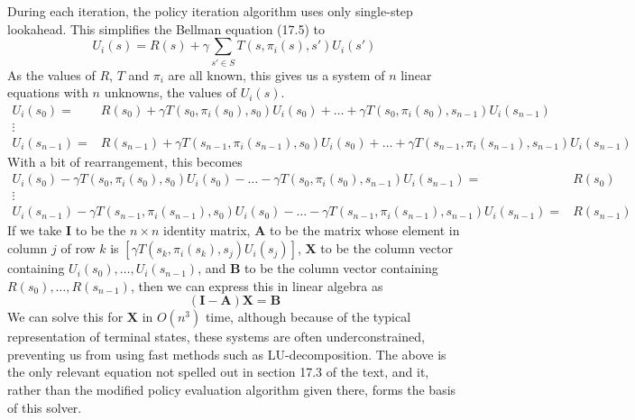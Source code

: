 \documentclass[paper=letter,pagesize=automedia,twoside=false,12pt]{scrartcl}
\theoremstyle{plain}%
\theoremstyle{definition}
\theoremstyle{remark}
\begin{document}
During each iteration, the policy iteration algorithm uses only single-step lookahead.  This simplifies the Bellman equation (17.5) to
\[ U_i(s) = R(s) + \gamma \sum_{s' \in S} T\left(s,\pi_i(s),s'\right) U_i\left(s'\right)
\]
As the values of \(R\), \(T\) and \(\pi_i\) are all known, this gives us a system of \(n\) linear equations with \(n\) unknowns, the values of \(U_i(s)\).
\begin{eqnarray*}
U_i(s_0) =&
R(s_0) + \gamma T\left(s_0,\pi_i(s_0),s_0\right) U_i\left(s_0\right) +
\ldots + \gamma T\left(s_0,\pi_i(s_0),s_{n-1}\right) U_i\left(s_{n-1}\right)
 \\
\vdots& \\
U_i(s_{n-1}) =&
R(s_{n-1}) + \gamma T\left(s_{n-1},\pi_i(s_{n-1}),s_0\right) U_i\left(s_0\right) +
\ldots + \gamma T\left(s_{n-1},\pi_i(s_{n-1}),s_{n-1}\right) U_i\left(s_{n-1}\right)
\end{eqnarray*}
With a bit of rearrangement, this becomes
\begin{eqnarray*}
U_i(s_0) - \gamma T\left(s_0,\pi_i(s_0),s_0\right) U_i\left(s_0\right) -
\ldots - \gamma T\left(s_0,\pi_i(s_0),s_{n-1}\right) U_i\left(s_{n-1}\right)
=& R(s_0)
 \\
\vdots& \\
U_i(s_{n-1}) - \gamma T\left(s_{n-1},\pi_i(s_{n-1}),s_0\right) U_i\left(s_0\right) -
\ldots - \gamma T\left(s_{n-1},\pi_i(s_{n-1}),s_{n-1}\right) U_i\left(s_{n-1}\right)
=& R(s_{n-1})
\end{eqnarray*}
If we take \(\mathbf{I}\) to be the \(n \times n\) identity matrix, \(\mathbf{A}\) to be the matrix whose element in column \(j\) of row \(k\) is \( \left[ \gamma T\left(s_k,\pi_i(s_k),s_j\right) U_i\left(s_j\right) \right] \), \(\mathbf{X}\) to be the column vector containing \( U_i(s_0), \ldots, U_i(s_{n-1}) \), and \(\mathbf{B}\) to be the column vector containing \( R(s_0), \ldots, R(s_{n-1}) \), then we can express this in linear algebra as
\[ \left( \mathbf{I} - \mathbf{A} \right) \mathbf{X} = \mathbf{B}
\]
We can solve this for \(\mathbf{X}\) in \(O\left(n^3\right)\) time, although because of the typical representation of terminal states, these systems are often underconstrained, preventing us from using fast methods such as LU-decomposition.  The above is the only relevant equation not spelled out in section 17.3 of the text, and it, rather than the modified policy evaluation algorithm given there, forms the basis of this solver.
\end{document}
